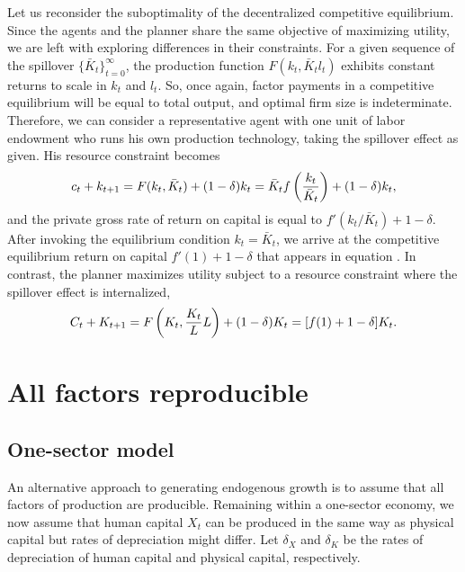 Let us reconsider the suboptimality of the decentralized
competitive equilibrium. Since the agents and the planner share
the same objective of maximizing utility, we are left with
exploring differences in their constraints. For a given sequence of
the spillover $\{\bar K_t\}_{t=0}^\infty$,
the production function $F(k_t,\bar K_t l_t)$
exhibits constant returns to scale in $k_t$ and $l_t$. So, once again,
factor payments in a competitive equilibrium will be equal to total
output, and optimal firm size is indeterminate. Therefore, we can
consider a representative agent with one unit of labor endowment who
runs his own production technology, taking the spillover effect as given. His
resource constraint becomes
$$
c_t + k_{t+1} = F(k_t,\bar K_t) + (1-\delta) k_t
              = \bar K_t f\left({k_t\over\bar K_t}\right) + (1-\delta) k_t,
$$
and the private gross rate of return on capital is equal to
$f'(k_t/\bar K_t) +1-\delta$.
After invoking the equilibrium condition $k_t=\bar K_t$, we arrive at
the competitive equilibrium return on capital $f'(1) +1-\delta$ that
appears in equation . In contrast, the
planner maximizes utility subject to a resource constraint where
the spillover effect is internalized,
$$
C_t + K_{t+1} = F\left(K_t, {K_t \over L} L\right) + (1-\delta) K_t
              = [f(1) + 1 - \delta] K_t.
$$
{}
\section{All factors reproducible}
\subsection{One-sector model}
An alternative approach to generating endogenous growth is to assume that
all factors of production are producible. Remaining within a one-sector
economy, we now assume that human capital $X_t$ can be produced in the
same way as physical capital but rates of depreciation might differ. Let
$\delta_X$ and $\delta_K$ be the rates of depreciation of human capital
and physical capital, respectively.


